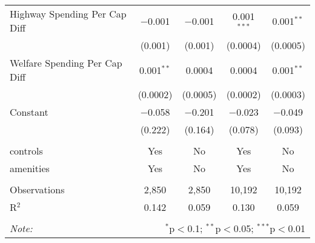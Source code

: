 \begin{table}[!htbp]
\begin{tabular}{@{\extracolsep{5pt}}lcccc}
  Highway Spending Per Cap Diff & $-$0.001 & $-$0.001 & 0.001$^{***}$ & 0.001$^{**}$ \\ 
  & (0.001) & (0.001) & (0.0004) & (0.0005) \\ 
  Welfare Spending Per Cap Diff & 0.001$^{**}$ & 0.0004 & 0.0004 & 0.001$^{**}$ \\ 
  & (0.0002) & (0.0005) & (0.0002) & (0.0003) \\ 
  Constant & $-$0.058 & $-$0.201 & $-$0.023 & $-$0.049 \\ 
  & (0.222) & (0.164) & (0.078) & (0.093) \\ 
 \hline \\[-1.8ex] 
controls & Yes & No & Yes & No \\ 
amenities & Yes & No & Yes & No \\ 
\hline \\[-1.8ex] 
Observations & 2,850 & 2,850 & 10,192 & 10,192 \\ 
R$^{2}$ & 0.142 & 0.059 & 0.130 & 0.059 \\ 
\hline 
\hline \\[-1.8ex] 
\textit{Note:}  & \multicolumn{4}{r}{$^{*}$p$<$0.1; $^{**}$p$<$0.05; $^{***}$p$<$0.01} \\ 
\end{tabular} 
\end{table} 
